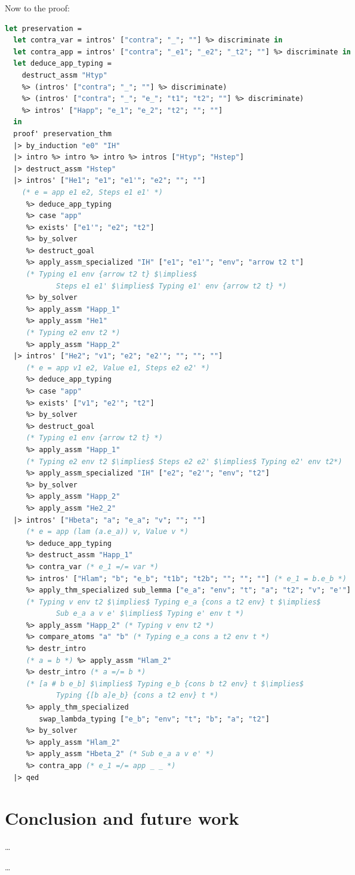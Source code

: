 \documentclass[english, mgr]{iithesis}
\begin{document}
Now to the proof:
\begin{lstlisting}[language=OCaml]
let preservation =
  let contra_var = intros' ["contra"; "_"; ""] %> discriminate in
  let contra_app = intros' ["contra"; "_e1"; "_e2"; "_t2"; ""] %> discriminate in
  let deduce_app_typing =
    destruct_assm "Htyp"
    %> (intros' ["contra"; "_"; ""] %> discriminate)
    %> (intros' ["contra"; "_"; "e_"; "t1"; "t2"; ""] %> discriminate)
    %> intros' ["Happ"; "e_1"; "e_2"; "t2"; ""; ""]
  in
  proof' preservation_thm
  |> by_induction "e0" "IH"
  |> intro %> intro %> intro %> intros ["Htyp"; "Hstep"]
  |> destruct_assm "Hstep"
  |> intros' ["He1"; "e1"; "e1'"; "e2"; ""; ""]
    (* e = app e1 e2, Steps e1 e1' *)
     %> deduce_app_typing
     %> case "app"
     %> exists' ["e1'"; "e2"; "t2"]
     %> by_solver
     %> destruct_goal
     %> apply_assm_specialized "IH" ["e1"; "e1'"; "env"; "arrow t2 t"]
     (* Typing e1 env {arrow t2 t} $\implies$
            Steps e1 e1' $\implies$ Typing e1' env {arrow t2 t} *)
     %> by_solver
     %> apply_assm "Happ_1"
     %> apply_assm "He1"
     (* Typing e2 env t2 *)
     %> apply_assm "Happ_2"
  |> intros' ["He2"; "v1"; "e2"; "e2'"; ""; ""; ""]
     (* e = app v1 e2, Value e1, Steps e2 e2' *)
     %> deduce_app_typing
     %> case "app"
     %> exists' ["v1"; "e2'"; "t2"]
     %> by_solver
     %> destruct_goal
     (* Typing e1 env {arrow t2 t} *)
     %> apply_assm "Happ_1"
     (* Typing e2 env t2 $\implies$ Steps e2 e2' $\implies$ Typing e2' env t2*)
     %> apply_assm_specialized "IH" ["e2"; "e2'"; "env"; "t2"]
     %> by_solver
     %> apply_assm "Happ_2"
     %> apply_assm "He2_2"
  |> intros' ["Hbeta"; "a"; "e_a"; "v"; ""; ""]
     (* e = app (lam (a.e_a)) v, Value v *)
     %> deduce_app_typing
     %> destruct_assm "Happ_1"
     %> contra_var (* e_1 =/= var *)
     %> intros' ["Hlam"; "b"; "e_b"; "t1b"; "t2b"; ""; ""; ""] (* e_1 = b.e_b *)
     %> apply_thm_specialized sub_lemma ["e_a"; "env"; "t"; "a"; "t2"; "v"; "e'"]
     (* Typing v env t2 $\implies$ Typing e_a {cons a t2 env} t $\implies$
            Sub e_a a v e' $\implies$ Typing e' env t *)
     %> apply_assm "Happ_2" (* Typing v env t2 *)
     %> compare_atoms "a" "b" (* Typing e_a cons a t2 env t *)
     %> destr_intro
     (* a = b *) %> apply_assm "Hlam_2"
     %> destr_intro (* a =/= b *)
     (* [a # b e_b] $\implies$ Typing e_b {cons b t2 env} t $\implies$
            Typing {[b a]e_b} {cons a t2 env} t *)
     %> apply_thm_specialized
        swap_lambda_typing ["e_b"; "env"; "t"; "b"; "a"; "t2"]
     %> by_solver
     %> apply_assm "Hlam_2"
     %> apply_assm "Hbeta_2" (* Sub e_a a v e' *)
     %> contra_app (* e_1 =/= app _ _ *)
  |> qed
\end{lstlisting}


\chapter{Conclusion and future work}

\dots


\begin{thebibliography}{1}
 \ldots
\end{thebibliography}
\end{document}
